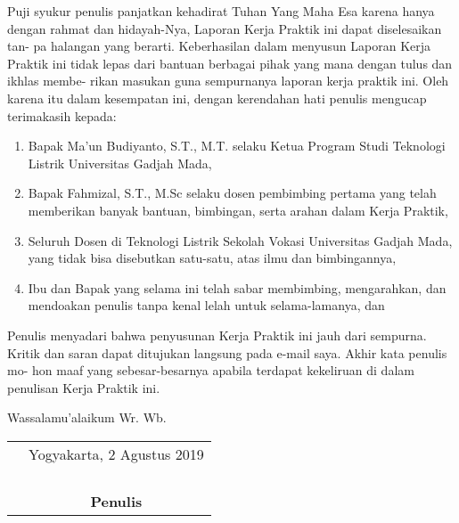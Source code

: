 \documentclass{DTEDI_KP}
\begin{document}
	
	\cover
	
	\approvalpage
	
	\preface
	
Puji syukur penulis panjatkan kehadirat Tuhan Yang Maha Esa karena hanya dengan rahmat dan hidayah-Nya, Laporan Kerja Praktik ini dapat diselesaikan tan- pa halangan yang berarti. Keberhasilan dalam menyusun Laporan Kerja Praktik ini tidak lepas dari bantuan berbagai pihak yang mana dengan tulus dan ikhlas membe- rikan masukan guna sempurnanya laporan kerja praktik ini.  Oleh karena itu dalam kesempatan ini, dengan kerendahan hati penulis mengucap terimakasih kepada:
	
	\begin{enumerate}
		\item Bapak Ma’un Budiyanto, S.T., M.T. selaku Ketua Program Studi Teknologi Listrik Universitas Gadjah Mada,
		\item  Bapak Fahmizal, S.T., M.Sc selaku dosen pembimbing pertama yang telah memberikan banyak bantuan, bimbingan, serta arahan dalam Kerja Praktik,
		\item Seluruh Dosen di Teknologi Listrik Sekolah Vokasi Universitas Gadjah Mada, yang tidak bisa disebutkan satu-satu, atas ilmu dan bimbingannya,
		\item Ibu dan Bapak yang selama ini telah sabar membimbing, mengarahkan, dan mendoakan penulis tanpa kenal lelah untuk selama-lamanya, dan
	\end{enumerate}

Penulis menyadari bahwa penyusunan Kerja Praktik ini jauh dari sempurna. Kritik dan saran dapat ditujukan langsung pada e-mail saya. Akhir kata penulis mo- hon maaf yang sebesar-besarnya apabila terdapat kekeliruan di dalam penulisan Kerja Praktik ini.

\vspace{0.1cm}

Wassalamu’alaikum Wr. Wb.

	\begin{tabular}{p{7.5cm}c}
	&Yogyakarta, 2 Agustus 2019\\
	&\\
	&\\
	&\\
	&\\
	&\textbf{Penulis}
	\end{tabular}

\tableofcontents
{}
\listoftables
{}
\listoffigures
{}

\begin{abstractind}
\end{abstractind}

\begin{abstracteng}
\end{abstracteng}

\newpage
\setcounter{page}{1}








\end{document}
